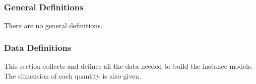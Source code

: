 \documentclass[12pt]{article}
\newcommand{\gdref}[1]{GD\ref{#1}}
\newcounter{theorynum} %
\newcommand{\tmref}[1]{TM\ref{#1}}
\newcommand{\aref}[1]{A\ref{#1}}
\newcommand{\deftheory}[9][Not Applicable]
{
  \vspace{-2mm}
\noindent \rule{\textwidth}{0.5mm}
\paragraph{Number: } TM\refstepcounter{theorynum}\thetheorynum
\phantomsection \label{#2}

\paragraph{Label:} #3

\noindent \rule{\textwidth}{0.5mm}

\paragraph{Equation:}

#4

\paragraph{Description:}

#5

\paragraph{Notes:}

#6

\paragraph{Source:}

#7

\paragraph{Ref.\ By:}

#8

\paragraph{Derivation for \tmref{#2}:}

#9

\noindent \rule{\textwidth}{0.5mm}

}
\begin{document}

\newpage

\subsubsection{General Definitions}\label{sec_gendef}



There are no general definitions.

\subsubsection{Data Definitions}\label{sec_datadef}

This section collects and defines all the data needed to build the instance
models. The dimension of each quantity is also given.
\end{document}
